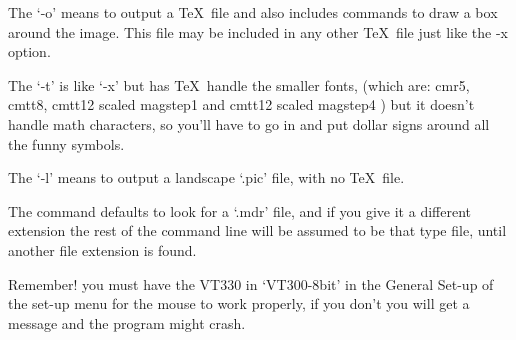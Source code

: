 The `-o' means to output a \TeX\ file and also includes commands to draw a
box around the image. This file may be included in any other \TeX\ file just
like the -x option. 

The `-t' is like `-x' but has \TeX\ handle the smaller fonts, (which are:
cmr5, cmtt8, cmtt12 scaled magstep1 and cmtt12 scaled magstep4 )
but it doesn't handle math characters, so you'll have to go in and put dollar signs
around all the funny symbols.

The `-l' means to output a landscape `.pic' file, with no \TeX\ file. 

The command defaults to look for a `.mdr'
file, and if you give it a different extension the rest of the command line will be
assumed to be that type file, until another file extension is found. 

Remember! you must have the VT330 in `VT300-8bit' in the General Set-up of
the set-up menu for the mouse to work properly, if you don't you will get a 
message and the program might crash.

\bye
